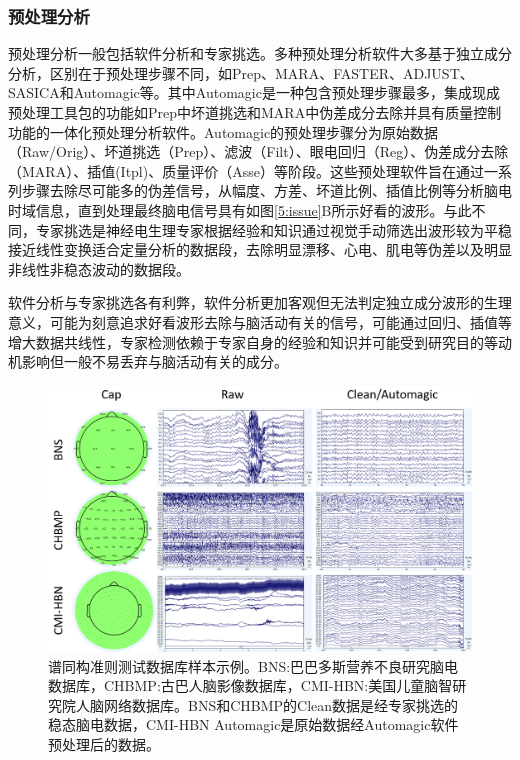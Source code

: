 \subsubsection{预处理分析}
预处理分析一般包括软件分析和专家挑选。多种预处理分析软件大多基于独立成分分析，区别在于预处理步骤不同，如Prep、MARA、FASTER、ADJUST、SASICA和Automagic等。其中Automagic是一种包含预处理步骤最多，集成现成预处理工具包的功能如Prep中坏道挑选和MARA中伪差成分去除并具有质量控制功能的一体化预处理分析软件。Automagic的预处理步骤分为原始数据（Raw/Orig）、坏道挑选（Prep）、滤波（Filt）、眼电回归（Reg）、伪差成分去除（MARA）、插值(Itpl)、质量评价（Asse）等阶段。这些预处理软件旨在通过一系列步骤去除尽可能多的伪差信号，从幅度、方差、坏道比例、插值比例等分析脑电时域信息，直到处理最终脑电信号具有如图\ref{5:issue}B所示好看的波形。与此不同，专家挑选是神经电生理专家根据经验和知识通过视觉手动筛选出波形较为平稳接近线性变换适合定量分析的数据段，去除明显漂移、心电、肌电等伪差以及明显非线性非稳态波动的数据段。

软件分析与专家挑选各有利弊，软件分析更加客观但无法判定独立成分波形的生理意义，可能为刻意追求好看波形去除与脑活动有关的信号，可能通过回归、插值等增大数据共线性，专家检测依赖于专家自身的经验和知识并可能受到研究目的等动机影响但一般不易丢弃与脑活动有关的成分。
\begin{figure}[!h]
\includegraphics[width=15cm]{pic/palos/data.png}
\caption{谱同构准则测试数据库样本示例。BNS:巴巴多斯营养不良研究脑电数据库，CHBMP:古巴人脑影像数据库，CMI-HBN:美国儿童脑智研究院人脑网络数据库。BNS和CHBMP的Clean数据是经专家挑选的稳态脑电数据，CMI-HBN Automagic是原始数据经Automagic软件预处理后的数据。}
\label{5:database}
\end{figure}

